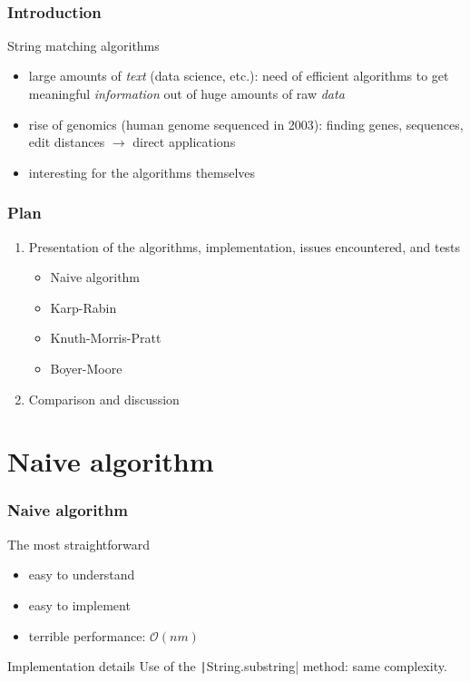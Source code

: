 \documentclass{beamer}
\begin{document}
\begin{frame}
  \titlepage\
\end{frame}

\begin{frame}
  \frametitle{Introduction}

  \begin{block}{String matching algorithms}
    \begin{itemize}
    \item large amounts of \emph{text} (data science, etc.): need of
      efficient algorithms to get meaningful \emph{information} out of
      huge amounts of raw \emph{data}
    \item rise of genomics (human genome sequenced in 2003): finding
      genes, sequences, edit distances $\rightarrow$ direct
      applications
    \item interesting for the algorithms themselves
    \end{itemize}
  \end{block}
\end{frame}

\begin{frame}
  \frametitle{Plan}

  \begin{enumerate}
  \item Presentation of the algorithms, implementation, issues
    encountered, and tests
    \begin{itemize}
    \item Naive algorithm
    \item Karp-Rabin
    \item Knuth-Morris-Pratt
    \item Boyer-Moore
    \end{itemize}
  \item Comparison and discussion
  \end{enumerate}
\end{frame}

\section{Naive algorithm}
\label{sec:naive-algorithm}

\begin{frame}
  \frametitle{Naive algorithm}
  
  \begin{block}{The most straightforward}
    \begin{itemize}
    \item easy to understand
    \item easy to implement
    \item terrible performance: $\mathcal{O}(nm)$
    \end{itemize}
  \end{block}

  \begin{block}{Implementation details}
    Use of the \texttt|String.substring| method: same
    complexity.
  \end{block}
  
\end{frame}
\end{document}
